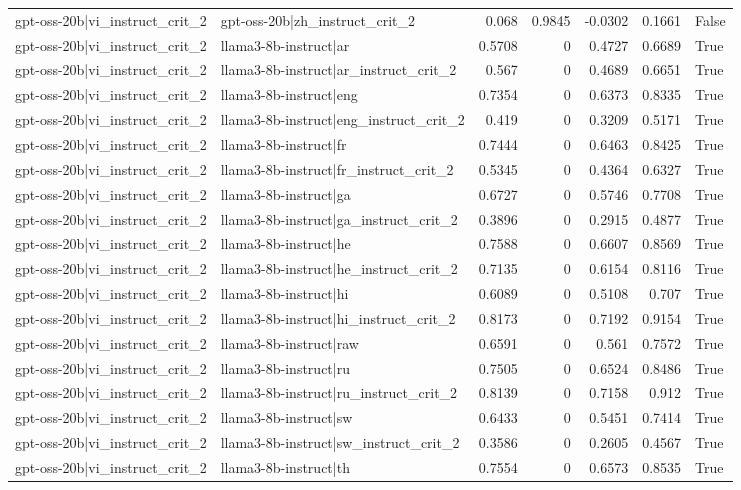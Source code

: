 \begin{table}
\begin{tabular}{l l r r r r l}
gpt-oss-20b|vi_instruct_crit_2 & gpt-oss-20b|zh_instruct_crit_2 & 0.068 & 0.9845 & -0.0302 & 0.1661 & False \\
gpt-oss-20b|vi_instruct_crit_2 & llama3-8b-instruct|ar & 0.5708 & 0 & 0.4727 & 0.6689 & True \\
gpt-oss-20b|vi_instruct_crit_2 & llama3-8b-instruct|ar_instruct_crit_2 & 0.567 & 0 & 0.4689 & 0.6651 & True \\
gpt-oss-20b|vi_instruct_crit_2 & llama3-8b-instruct|eng & 0.7354 & 0 & 0.6373 & 0.8335 & True \\
gpt-oss-20b|vi_instruct_crit_2 & llama3-8b-instruct|eng_instruct_crit_2 & 0.419 & 0 & 0.3209 & 0.5171 & True \\
gpt-oss-20b|vi_instruct_crit_2 & llama3-8b-instruct|fr & 0.7444 & 0 & 0.6463 & 0.8425 & True \\
gpt-oss-20b|vi_instruct_crit_2 & llama3-8b-instruct|fr_instruct_crit_2 & 0.5345 & 0 & 0.4364 & 0.6327 & True \\
gpt-oss-20b|vi_instruct_crit_2 & llama3-8b-instruct|ga & 0.6727 & 0 & 0.5746 & 0.7708 & True \\
gpt-oss-20b|vi_instruct_crit_2 & llama3-8b-instruct|ga_instruct_crit_2 & 0.3896 & 0 & 0.2915 & 0.4877 & True \\
gpt-oss-20b|vi_instruct_crit_2 & llama3-8b-instruct|he & 0.7588 & 0 & 0.6607 & 0.8569 & True \\
gpt-oss-20b|vi_instruct_crit_2 & llama3-8b-instruct|he_instruct_crit_2 & 0.7135 & 0 & 0.6154 & 0.8116 & True \\
gpt-oss-20b|vi_instruct_crit_2 & llama3-8b-instruct|hi & 0.6089 & 0 & 0.5108 & 0.707 & True \\
gpt-oss-20b|vi_instruct_crit_2 & llama3-8b-instruct|hi_instruct_crit_2 & 0.8173 & 0 & 0.7192 & 0.9154 & True \\
gpt-oss-20b|vi_instruct_crit_2 & llama3-8b-instruct|raw & 0.6591 & 0 & 0.561 & 0.7572 & True \\
gpt-oss-20b|vi_instruct_crit_2 & llama3-8b-instruct|ru & 0.7505 & 0 & 0.6524 & 0.8486 & True \\
gpt-oss-20b|vi_instruct_crit_2 & llama3-8b-instruct|ru_instruct_crit_2 & 0.8139 & 0 & 0.7158 & 0.912 & True \\
gpt-oss-20b|vi_instruct_crit_2 & llama3-8b-instruct|sw & 0.6433 & 0 & 0.5451 & 0.7414 & True \\
gpt-oss-20b|vi_instruct_crit_2 & llama3-8b-instruct|sw_instruct_crit_2 & 0.3586 & 0 & 0.2605 & 0.4567 & True \\
gpt-oss-20b|vi_instruct_crit_2 & llama3-8b-instruct|th & 0.7554 & 0 & 0.6573 & 0.8535 & True \\

\end{tabular}
\end{table}
